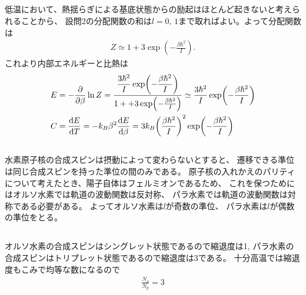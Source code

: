 \documentclass[../../master.tex]{subfiles}
\begin{document}
\subsection{}
低温において、熱揺らぎによる基底状態からの励起はほとんど起きないと考えられることから、
設問2の分配関数の和は\(l=0,\,1\)まで取ればよい。よって分配関数は
\begin{align}
    Z \simeq 1 + 3\exp(-\frac{\beta\hbar^2}{I}).
\end{align}
これより内部エネルギーと比熱は
\begin{align}
    E &= -\pdv{\beta} \ln Z
    = \dfrac{\dfrac{3\hbar^2}{I}\exp(-\dfrac{\beta\hbar^2}{I})}{1++ 3\exp(-\frac{\beta\hbar^2}{I})}
        \simeq \frac{3\hbar^2}{I}\exp(-\frac{\beta\hbar^2}{I})\\
    C &= \dv{E}{T} = -k_B\beta^2\dv{E}{\beta}
    = 3k_B\qty(\frac{\beta\hbar^2}{I})^2\exp(-\frac{\beta\hbar^2}{I})
\end{align}

\subsection{}
水素原子核の合成スピンは摂動によって変わらないとすると、
遷移できる準位は同じ合成スピンを持った準位の間のみである。
原子核の入れかえのパリティについて考えたとき、陽子自体はフェルミオンであるため、
これを保つためにはオルソ水素では軌道の波動関数は反対称、
パラ水素では軌道の波動関数は対称である必要がある。
よってオルソ水素は\(l\)が奇数の準位、
パラ水素は\(l\)が偶数の準位をとる。

\subsection{}
オルソ水素の合成スピンはシングレット状態であるので縮退度は1,
パラ水素の合成スピンはトリプレット状態であるので縮退度は3である。
十分高温では縮退度もこみで均等な数になるので
\begin{align}
    \frac{N_o}{N_p} = 3
\end{align}
\end{document}
